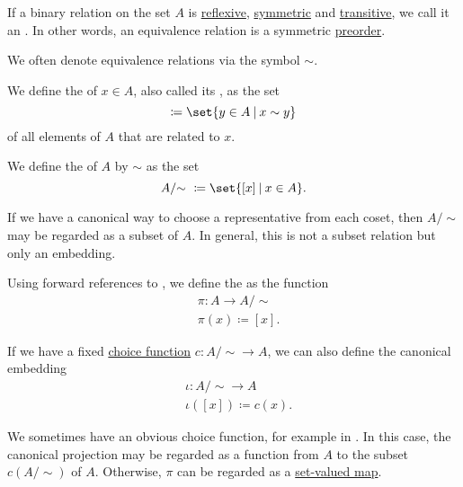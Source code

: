 \begin{definition}\label{def:equivalence_relation}\mimprovised
  If a binary relation on the set \( A \) is \hyperref[def:binary_relation/reflexive]{reflexive}, \hyperref[def:binary_relation/symmetric]{symmetric} and \hyperref[def:binary_relation/transitive]{transitive}, we call it an . In other words, an equivalence relation is a symmetric \hyperref[def:preordered_set]{preorder}.

  We often denote equivalence relations via the symbol \( \sim \).

  \begin{thmenum}
     We define the  of \( x \in A \), also called its , as the set
    \begin{equation*}
      [x] \coloneqq \set{ y \in A \given x \sim y }
    \end{equation*}
    of all elements of \( A \) that are related to \( x \).

     We define the  of \( A \) by \( \sim \) as the set
    \begin{equation*}
      A / {\sim} \ \coloneqq \set{ [x] \given x \in A }.
    \end{equation*}

     If we have a canonical way to choose a representative from each coset, then \( A / {\sim} \) may be regarded as a subset of \( A \). In general, this is not a subset relation but only an embedding.

     Using forward references to , we define the  as the function
    \begin{equation*}
      \begin{aligned}
        &\pi: A \to A / {\sim}  \\
        &\pi(x) \coloneqq [x].
      \end{aligned}
    \end{equation*}

    If we have a fixed \hyperref[def:choice_function]{choice function} \( c: A / {\sim} \to A \), we can also define the canonical embedding
    \begin{equation*}
      \begin{aligned}
        &\iota: A / {\sim} \to A \\
        &\iota([x]) \coloneqq c(x).
      \end{aligned}
    \end{equation*}

    We sometimes have an obvious choice function, for example in . In this case, the canonical projection may be regarded as a function from \( A \) to the subset \( c(A / {\sim}) \) of \( A \). Otherwise, \( \pi \) can be regarded as a \hyperref[def:function]{set-valued map}.
  \end{thmenum}
\end{definition}

